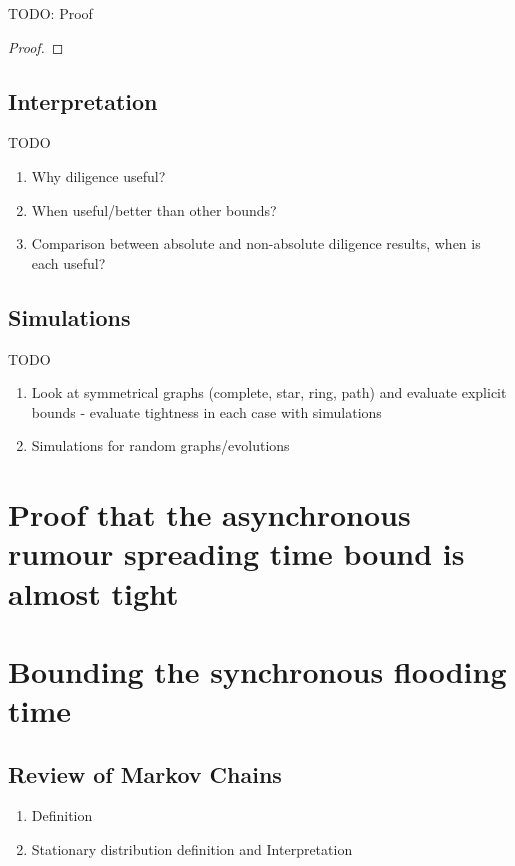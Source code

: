 \documentclass[a4paper,11pt]{article}
\theoremstyle{definition}
\begin{document}
TODO: Proof

\begin{proof}

\end{proof}

\subsection{Interpretation}

TODO

\begin{enumerate}
	\item Why diligence useful?
	\item When useful/better than other bounds?
	\item Comparison between absolute and non-absolute  diligence results, when is each useful?
\end{enumerate}

\subsection{Simulations}

TODO 

\begin{enumerate}
	\item Look at symmetrical graphs (complete, star, ring, path) and evaluate explicit bounds - evaluate tightness in each case with simulations
	\item Simulations for random graphs/evolutions
\end{enumerate}

\section{Proof that the asynchronous rumour spreading time bound is almost tight}
\label{AsyncLowerBoundSection}

\section{Bounding the synchronous flooding time}
\label{SyncFloodingSection}

\subsection{Review of Markov Chains}

\begin{enumerate}
	\item Definition
	\item Stationary distribution definition and Interpretation
\end{enumerate}
\end{document}
